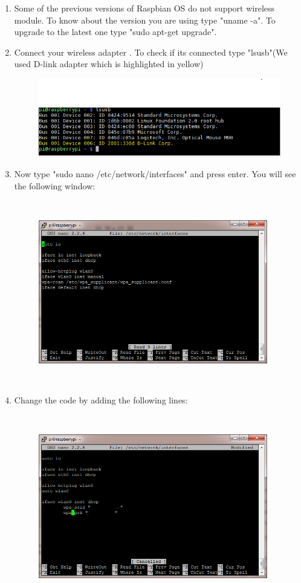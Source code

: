 \documentclass[11pt,a4paper]{article}
\begin{document}
\begin{enumerate}
\begin{figure}[h!]
			\centering
		\end{figure}
		\item  Some of the previous versions of Raspbian OS do not support wireless module. To know about the version you are using type "uname -a". To upgrade to the latest one type "sudo apt-get upgrade".
		\item Connect your wireless adapter . To check if its connected type "lsusb"(We used D-link adapter which is highlighted in yellow) 
		\begin{figure}[h!]
			\includegraphics{Lsusb.PNG}
			\centering
		\end{figure}
		\newpage
		\item Now type "sudo nano /etc/network/interfaces" and press enter. You will see the following window:
		\begin{figure}[h!]
			\includegraphics[width=10cm,height=8cm]{iwifi.png}
			\centering
		\end{figure}
		\item Change the code by adding the following lines:
		\begin{figure}[h!]
			\includegraphics[width=10cm,height=8cm]{wificon.png}

\end{figure}
\end{enumerate}
\end{document}
